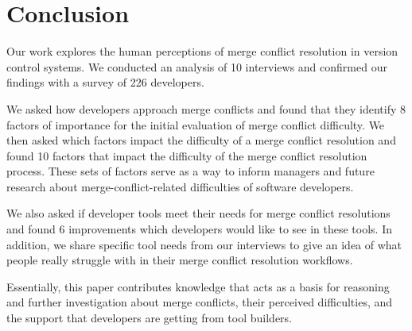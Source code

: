 \section{Conclusion}\label{conclusion}
Our work explores the human perceptions of merge conflict resolution in version control systems. We conducted an analysis of 10 interviews and confirmed our findings with a survey of 226 developers.

We asked how developers approach merge conflicts and found that they identify 8 factors of importance for the initial evaluation of merge conflict difficulty. 
We then asked which factors impact the difficulty of a merge conflict resolution and found 10 factors that impact the difficulty of the merge conflict resolution process. 
These sets of factors serve as a way to inform managers and future research about merge-conflict-related difficulties of software developers.

We also asked if developer tools meet their needs for merge conflict resolutions and found 6 improvements which developers would like to see in these tools. In addition, we share specific tool needs from our interviews to give an idea of what people really struggle with in their merge conflict resolution workflows.

Essentially, this paper contributes knowledge that acts as a basis for reasoning and further investigation about merge conflicts, their perceived difficulties, and the support that developers are getting from tool builders.